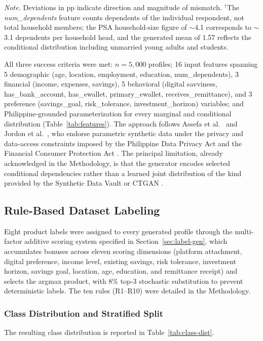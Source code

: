 \documentclass{icsthesis}
\begin{document}
\begin{mainmatter}
\begin{table}[h]
					\vspace{0.5em}
					\raggedright\scriptsize \emph{Note.} Deviations in pp indicate direction and magnitude of mismatch. $^\dagger$The \emph{num\_dependents} feature counts dependents of the individual respondent, not total household members; the PSA household-size figure of $\sim$4.1 corresponds to $\sim$3.1 dependents per household head, and the generated mean of 1.57 reflects the conditional distribution including unmarried young adults and students.
					\vspace{4ex}
					\end{table}

					All three success criteria were met: $n = 5{,}000$ profiles; 16 input features spanning 5 demographic (age, location, employment, education, num\_dependents), 3 financial (income, expenses, savings), 5 behavioral (digital savviness, has\_bank\_account, has\_ewallet, primary\_ewallet, receives\_remittance), and 3 preference (savings\_goal, risk\_tolerance, investment\_horizon) variables; and Philippine-grounded parameterization for every marginal and conditional distribution (Table~\ref{tab:features}). The approach follows Assefa et al.\ \cite{ref46} and Jordon et al.\ \cite{ref83}, who endorse parametric synthetic data under the privacy and data-access constraints imposed by the Philippine Data Privacy Act \cite{ref45} and the Financial Consumer Protection Act \cite{ref44}. The principal limitation, already acknowledged in the Methodology, is that the generator encodes selected conditional dependencies rather than a learned joint distribution of the kind provided by the Synthetic Data Vault \cite{ref29} or CTGAN \cite{ref34}.

			\subsection{Rule-Based Dataset Labeling}
				Eight product labels were assigned to every generated profile through the multi-factor additive scoring system specified in Section~\ref{sec:label-gen}, which accumulates bonuses across eleven scoring dimensions (platform attachment, digital preference, income level, existing savings, risk tolerance, investment horizon, savings goal, location, age, education, and remittance receipt) and selects the argmax product, with 8\% top-3 stochastic substitution to prevent deterministic labels. The ten rules (R1--R10) were detailed in the Methodology.

				\subsubsection{Class Distribution and Stratified Split}
					The resulting class distribution is reported in Table~\ref{tab:class-dist}.


\end{mainmatter}
\end{document}

